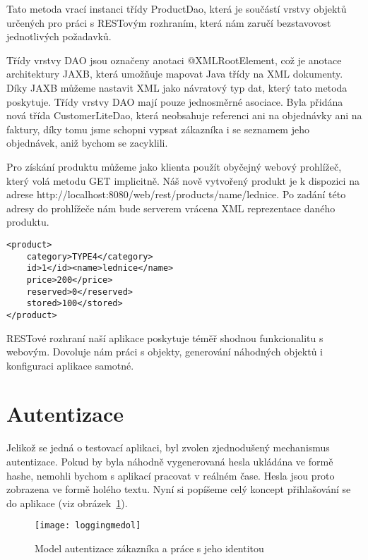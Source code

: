 \documentclass[122pt,oneside]{fithesis}
\begin{document}
Tato metoda vrací instanci třídy ProductDao, která je součástí vrstvy objektů určených pro práci s RESTovým rozhraním, která nám zaručí bezstavovost jednotlivých požadavků. 

Třídy vrstvy DAO jsou označeny anotaci @XMLRootElement, což je anotace architektury JAXB, která umožňuje mapovat Java třídy na XML dokumenty. Díky JAXB můžeme nastavit XML jako návratový typ dat, který tato metoda poskytuje. Třídy vrstvy DAO mají pouze jednosměrné asociace. Byla přidána nová třída CustomerLiteDao, která neobsahuje referenci ani na objednávky ani na faktury, díky tomu jsme schopni vypsat zákazníka i se seznamem jeho objednávek, aniž bychom se zacyklili.

Pro získání produktu můžeme jako klienta použít obyčejný webový prohlížeč, který volá metodu GET implicitně. Náš nově vytvořený produkt je k dispozici na adrese http://localhost:8080/web/rest/products/name/lednice.
Po zadání této adresy do prohlížeče nám bude serverem vrácena XML reprezentace daného produktu.

\begin{lstlisting}
<product>
	category>TYPE4</category>
	id>1</id><name>lednice</name>
	price>200</price>
	reserved>0</reserved>
	stored>100</stored>
</product>
\end{lstlisting}

RESTové rozhraní naší aplikace poskytuje téměř shodnou funkcionalitu s webovým. Dovoluje nám práci s objekty, generování náhodných objektů i konfiguraci aplikace samotné.

\section{Autentizace}
Jelikož se jedná o testovací aplikaci, byl zvolen zjednodušený mechanismus autentizace. Pokud by byla náhodně vygenerovaná hesla ukládána ve formě hashe, nemohli bychom s aplikací pracovat v reálném čase. Hesla jsou proto zobrazena ve formě holého textu. Nyní si popíšeme celý koncept přihlašování se do aplikace (viz obrázek~\ref{img:identity}).

\begin{figure}[!ht]
\centering
\texttt{[image: loggingmedol]}
\caption{Model autentizace zákazníka a práce s jeho identitou}
\label{img:identity}
\end{figure}
\end{document}
